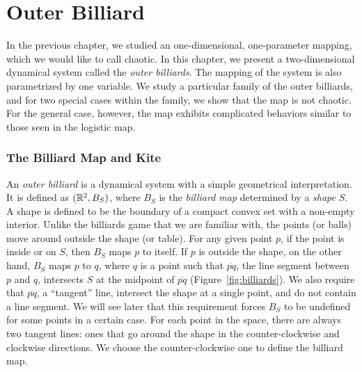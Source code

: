 \documentclass[10pt,twoside]{book}
\begin{document}
\label{chap:billiards}
\chapter{Outer Billiard}
In the previous chapter, we studied an one-dimensional, one-parameter mapping, which we would like to call chaotic.
In this chapter, we present a two-dimensional dynamical system called the \textit{outer billiards}.
The mapping of the system is also parametrized by one variable. 
We study a particular family of the outer billiards, and for two special cases within the family, we show that the map is not chaotic.
For the general case, however, the map exhibits complicated behaviors similar to those seen in the logistic map.

\subsection*{The Billiard Map and Kite}
An \textit{outer billiard} is a dynamical system with a simple geometrical interpretation.
It is defined as $(\mathbb{R}^2, B_S)$, where $B_S$ is the \textit{billiard map} determined by a \textit{shape} $S$.
A shape is defined to be the boundary of a compact convex set with a non-empty interior.
Unlike the billiards game that we are familiar with, the points (or balls) move around outside the shape (or table).
For any given point $p$, if the point is inside or on $S$, then $B_S$ maps $p$ to itself.
If $p$ is outside the shape, on the other hand, $B_S$ maps $p$ to $q$, where $q$ is a point such that $\overline{pq}$, the line segment between $p$ and $q$, intersects $S$ at the midpoint of $\overline{pq}$ (Figure~\ref{fig:billiards}).
We also require that $\overline{pq}$, a ``tangent'' line, intersect the shape at a single point, and do not contain a line segment.
We will see later that this requirement forces $B_S$ to be undefined for some points in a certain case.
For each point in the space, there are always two tangent lines: ones that go around the shape in the counter-clockwise and clockwise directions.
We choose the counter-clockwise one to define the billiard map.
\end{document}
